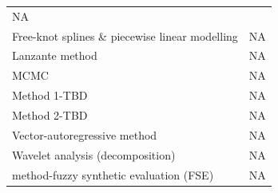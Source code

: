 \documentclass[12pt,twoside,openany]{reedthesis}
\begin{document}
\begin{longtable}[]{@{}lc@{}}
\begin{minipage}[t]{0.35\columnwidth}
NA\strut
\end{minipage}\tabularnewline
\begin{minipage}[t]{0.31\columnwidth}\raggedright
Free-knot
splines \&
piecewise linear
modelling\strut
\end{minipage} & \begin{minipage}[t]{0.35\columnwidth}\centering
NA\strut
\end{minipage}\tabularnewline
\begin{minipage}[t]{0.31\columnwidth}\raggedright
Lanzante method\strut
\end{minipage} & \begin{minipage}[t]{0.35\columnwidth}\centering
NA\strut
\end{minipage}\tabularnewline
\begin{minipage}[t]{0.31\columnwidth}\raggedright
MCMC\strut
\end{minipage} & \begin{minipage}[t]{0.35\columnwidth}\centering
NA\strut
\end{minipage}\tabularnewline
\begin{minipage}[t]{0.31\columnwidth}\raggedright
Method 1-TBD\strut
\end{minipage} & \begin{minipage}[t]{0.35\columnwidth}\centering
NA\strut
\end{minipage}\tabularnewline
\begin{minipage}[t]{0.31\columnwidth}\raggedright
Method 2-TBD\strut
\end{minipage} & \begin{minipage}[t]{0.35\columnwidth}\centering
NA\strut
\end{minipage}\tabularnewline
\begin{minipage}[t]{0.31\columnwidth}\raggedright
Vector-autoregressive
method\strut
\end{minipage} & \begin{minipage}[t]{0.35\columnwidth}\centering
NA\strut
\end{minipage}\tabularnewline
\begin{minipage}[t]{0.31\columnwidth}\raggedright
Wavelet analysis
(decomposition)\strut
\end{minipage} & \begin{minipage}[t]{0.35\columnwidth}\centering
NA\strut
\end{minipage}\tabularnewline
\begin{minipage}[t]{0.31\columnwidth}\raggedright
method-fuzzy
synthetic
evaluation (FSE)\strut
\end{minipage} & \begin{minipage}[t]{0.35\columnwidth}\centering
NA\strut
\end{minipage}\tabularnewline
\bottomrule
\end{longtable}
\end{document}
